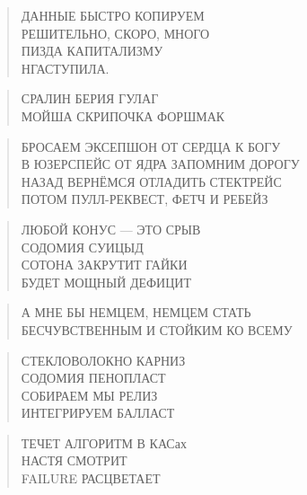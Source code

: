 \poemtitle{***}
\begin{verse}
ДАННЫЕ БЫСТРО КОПИРУЕМ\\
РЕШИТЕЛЬНО, СКОРО, МНОГО\\
ПИЗДА КАПИТАЛИЗМУ\\
НГАСТУПИЛА.
\end{verse}

\poemtitle{***}
\begin{verse}
СРАЛИН БЕРИЯ ГУЛАГ\\
МОЙША СКРИПОЧКА ФОРШМАК
\end{verse}

\poemtitle{***}
\begin{verse}
БРОСАЕМ ЭКСЕПШОН ОТ СЕРДЦА К БОГУ\\
В ЮЗЕРСПЕЙС ОТ ЯДРА ЗАПОМНИМ ДОРОГУ\\
НАЗАД ВЕРНЁМСЯ ОТЛАДИТЬ СТЕКТРЕЙС\\
ПОТОМ ПУЛЛ-РЕКВЕСТ, ФЕТЧ И РЕБЕЙЗ
\end{verse}

\poemtitle{***}
\begin{verse}
ЛЮБОЙ КОНУС — ЭТО СРЫВ\\
СОДОМИЯ СУИЦЫД\\
СОТОНА ЗАКРУТИТ ГАЙКИ\\
БУДЕТ МОЩНЫЙ ДЕФИЦИТ
\end{verse}

\poemtitle{***}
\begin{verse}
А МНЕ БЫ НЕМЦЕМ, НЕМЦЕМ СТАТЬ\\
БЕСЧУВСТВЕННЫМ И СТОЙКИМ КО ВСЕМУ
\end{verse}

\poemtitle{***}
\begin{verse}
СТЕКЛОВОЛОКНО КАРНИЗ\\
СОДОМИЯ ПЕНОПЛАСТ\\
СОБИРАЕМ МЫ РЕЛИЗ\\
ИНТЕГРИРУЕМ БАЛЛАСТ
\end{verse}

\poemtitle{***}
\begin{verse}
ТЕЧЕТ АЛГОРИТМ В КАСах\\
НАСТЯ СМОТРИТ\\
FAILURE РАСЦВЕТАЕТ
\end{verse}

